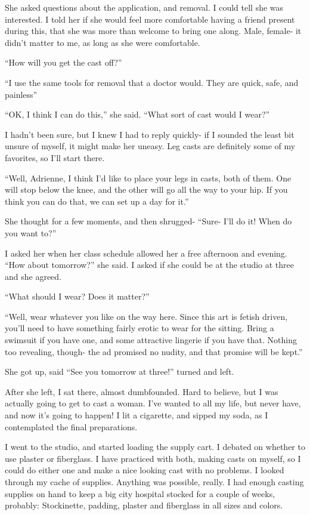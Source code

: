     She asked questions about the application, and removal. I could tell she was interested. I
told her if she would feel more comfortable having a friend present during this, that she was
more than welcome to bring one along. Male, female- it didn't matter to me, as long as she were
comfortable.

    ``How will you get the cast off?''

    ``I use the same tools for removal that a doctor would. They are quick, safe, and painless''

    ``OK, I think I can do this,'' she said. ``What sort of cast would I wear?''

    I hadn't been sure, but I knew I had to reply quickly- if I sounded the least bit unsure of
myself, it might make her uneasy. Leg casts are definitely some of my favorites, so I'll start
there.

    ``Well, Adrienne, I think I'd like to place your legs in casts, both of them. One will stop
below the knee, and the other will go all the way to your hip. If you think you can do that, we
can set up a day for it.''

    She thought for a few moments, and then shrugged- ``Sure- I'll do it! When do you want to?''

    I asked her when her class schedule allowed her a free afternoon and evening. ``How about
tomorrow?'' she said. I asked if she could be at the studio at three and she agreed.

    ``What should I wear? Does it matter?''

    ``Well, wear whatever you like on the way here. Since this art is fetish driven, you'll need
to have something fairly erotic to wear for the sitting. Bring a swimsuit if you have one, and
some attractive lingerie if you have that. Nothing too revealing, though- the ad promised no
nudity, and that promise will be kept.''

    She got up, said ``See you tomorrow at three!'' turned and left.

    After she left, I sat there, almost dumbfounded. Hard to believe, but I was actually going
to get to cast a woman. I've wanted to all my life, but never have, and now it's going to
happen! I lit a cigarette, and sipped my soda, as I contemplated the final preparations.

    I went to the studio, and started loading the supply cart. I debated on whether to use
plaster or fiberglass. I have practiced with both, making casts on myself, so I could do either
one and make a nice looking cast with no problems. I looked through my cache of supplies.
Anything was possible, really. I had enough casting supplies on hand to keep a big city hospital
stocked for a couple of weeks, probably: Stockinette, padding, plaster and fiberglass in all
sizes and colors.

